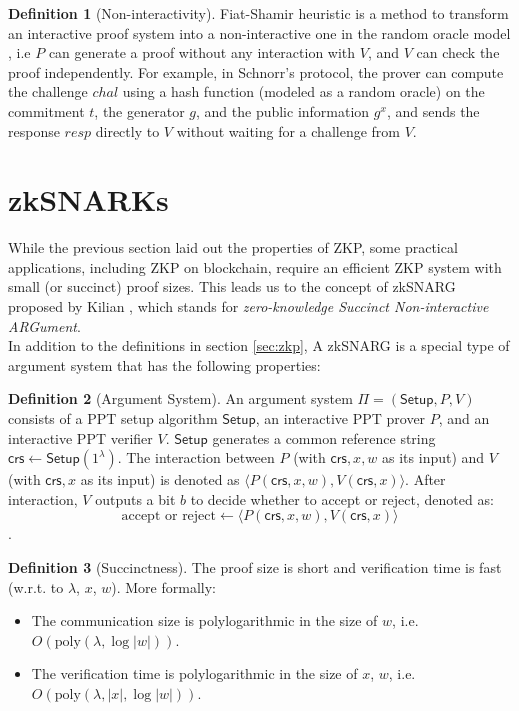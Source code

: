 \documentclass[12pt]{article}
\theoremstyle{definition}
\newtheorem{definition}{Definition}[section]
\begin{document}
\begin{definition}[Non-interactivity] Fiat-Shamir heuristic \cite{FS} is a method to transform an interactive proof system into a non-interactive one in the random oracle model \cite{RO}, i.e $P$ can generate a proof without any interaction with $V$, and $V$ can check the proof independently. For example, in Schnorr's protocol, the prover can compute the challenge $chal$ using a hash function (modeled as a random oracle) on the commitment $t$, the generator $g$, and the public information $g^x$, and sends the response $resp$ directly to $V$ without waiting for a challenge from $V$.
\end{definition}

\section{zkSNARKs}
While the previous section laid out the properties of ZKP, some practical applications, including ZKP on blockchain, require an efficient ZKP system with small (or succinct) proof sizes. This leads us to the concept of zkSNARG proposed by Kilian \cite{succinct}, which stands for \emph{zero-knowledge Succinct Non-interactive ARGument}.\\

In addition to the definitions in section \ref{sec:zkp}, A zkSNARG is a special type of argument system that has the following properties:

\begin{definition}[Argument System]
An argument system $\Pi=(\mathsf{Setup}, P, V)$ consists of a PPT setup algorithm $\mathsf{Setup}$, an interactive PPT prover $P$, and an interactive PPT verifier $V$. $\mathsf{Setup}$ generates a common reference string $\mathsf{crs} \leftarrow \mathsf{Setup}(1^\lambda)$. The interaction between $P$ (with $\mathsf{crs},x,w$ as its input) and $V$ (with $\mathsf{crs},x$ as its input) is denoted as $\langle P(\mathsf{crs},x,w),V(\mathsf{crs},x)\rangle$. After interaction, $V$ outputs a bit $b$ to decide whether to accept or reject, denoted as: 
\[
\text{accept or reject} \leftarrow \langle P(\mathsf{crs},x,w),V(\mathsf{crs},x)\rangle 
\].
\end{definition}

\begin{definition}[Succinctness] The proof size is short and verification time is fast (w.r.t. to $\lambda$, $x$, $w$). More formally:
    \begin{itemize}
        \item The communication size is polylogarithmic in the size of $w$, i.e. \(O(\text{poly}(\lambda, \log|w|))\).
        \item The verification time is polylogarithmic in the size of $x$, $w$, i.e. \(O(\text{poly}(\lambda, |x|, \log|w|))\).
    \end{itemize}
\end{definition}
\end{document}
